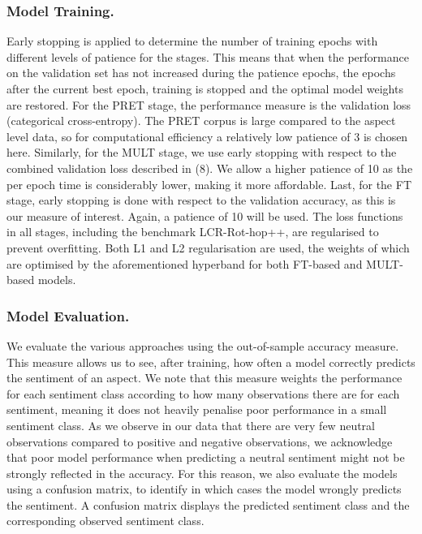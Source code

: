 \documentclass[runningheads]{llncs}
\begin{document}
\subsubsection*{Model Training.}
Early stopping is applied to determine the number of training epochs with different levels of patience for the stages. This means that when the performance on the validation set has not increased during the patience epochs, the epochs after the current best epoch, training is stopped and the optimal model weights are restored. For the PRET stage, the performance measure is the validation loss (categorical cross-entropy). The PRET corpus is large compared to the aspect level data, so for computational efficiency a relatively low patience of 3 is chosen here. Similarly, for the MULT stage, we use early stopping with respect to the combined validation loss described in (8). We allow a higher patience of 10 as the per epoch time is considerably lower, making it more affordable. Last, for the FT stage, early stopping is done with respect to the validation accuracy, as this is our measure of interest. Again, a patience of 10 will be used. The loss functions in all stages, including the benchmark LCR-Rot-hop++, are regularised to prevent overfitting. Both L1 and L2 regularisation are used, the weights of which are optimised by the aforementioned hyperband for both FT-based and MULT-based models.

\subsubsection*{Model Evaluation.}

We evaluate the various approaches using the out-of-sample accuracy measure. This measure allows us to see, after training, how often a model correctly predicts the sentiment of an aspect. We note that this measure weights the performance for each sentiment class according to how many observations there are for each sentiment, meaning it does not heavily penalise poor performance in a small sentiment class. As we observe in our data that there are very few neutral observations compared to positive and negative observations, we acknowledge that poor model performance when predicting a neutral sentiment might not be strongly reflected in the accuracy. For this reason, we also evaluate the models using a confusion matrix, to identify in which cases the model wrongly predicts the sentiment. A confusion matrix displays the predicted sentiment class and the corresponding observed sentiment class.
\end{document}
